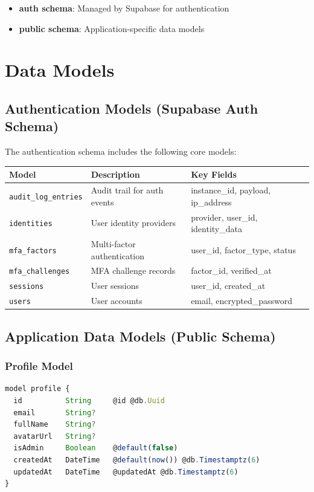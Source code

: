 \documentclass[12pt,a4paper]{report}
\begin{document}
\begin{itemize}
    \item \textbf{auth schema}: Managed by Supabase for authentication
    \item \textbf{public schema}: Application-specific data models
\end{itemize}

\section{Data Models}

\subsection{Authentication Models (Supabase Auth Schema)}

The authentication schema includes the following core models:

\begin{longtable}{|p{3cm}|p{5cm}|p{4cm}|}
\hline
\textbf{Model} & \textbf{Description} & \textbf{Key Fields} \\
\hline
\texttt{audit\_log\_entries} & Audit trail for auth events & instance\_id, payload, ip\_address \\
\hline
\texttt{identities} & User identity providers & provider, user\_id, identity\_data \\
\hline
\texttt{mfa\_factors} & Multi-factor authentication & user\_id, factor\_type, status \\
\hline
\texttt{mfa\_challenges} & MFA challenge records & factor\_id, verified\_at \\
\hline
\texttt{sessions} & User sessions & user\_id, created\_at \\
\hline
\texttt{users} & User accounts & email, encrypted\_password \\
\hline
\end{longtable}

\subsection{Application Data Models (Public Schema)}

\subsubsection{Profile Model}

\begin{lstlisting}[language=javascript, caption=Profile Model]
model profile {
  id          String     @id @db.Uuid
  email       String?    
  fullName    String?
  avatarUrl   String?
  isAdmin     Boolean    @default(false)
  createdAt   DateTime   @default(now()) @db.Timestamptz(6)
  updatedAt   DateTime   @updatedAt @db.Timestamptz(6)
}
\end{lstlisting}
\end{document}

